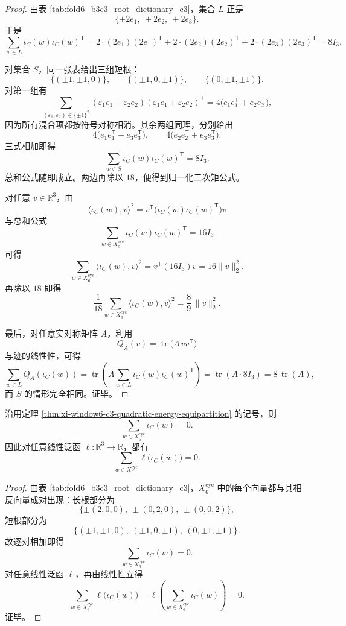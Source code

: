 \begin{proof}
由表 \ref{tab:fold6_b3c3_root_dictionary_c3}，集合 \(L\) 正是
\[
\{\pm 2e_1,\ \pm 2e_2,\ \pm 2e_3\}.
\]
于是
\[
\sum_{w\in L}\iota_C(w)\iota_C(w)^{\mathsf T}
=
2\cdot(2e_1)(2e_1)^{\mathsf T}
+2\cdot(2e_2)(2e_2)^{\mathsf T}
+2\cdot(2e_3)(2e_3)^{\mathsf T}
=
8I_3.
\]

对集合 \(S\)，同一张表给出三组短根：
\[
\{(\pm1,\pm1,0)\},
\qquad
\{(\pm1,0,\pm1)\},
\qquad
\{(0,\pm1,\pm1)\}.
\]
对第一组有
\[
\sum_{(\varepsilon_1,\varepsilon_2)\in\{\pm1\}^2}
(\varepsilon_1 e_1+\varepsilon_2 e_2)
(\varepsilon_1 e_1+\varepsilon_2 e_2)^{\mathsf T}
=
4\bigl(e_1e_1^{\mathsf T}+e_2e_2^{\mathsf T}\bigr),
\]
因为所有混合项都按符号对称相消。其余两组同理，分别给出
\[
4\bigl(e_1e_1^{\mathsf T}+e_3e_3^{\mathsf T}\bigr),
\qquad
4\bigl(e_2e_2^{\mathsf T}+e_3e_3^{\mathsf T}\bigr).
\]
三式相加即得
\[
\sum_{w\in S}\iota_C(w)\iota_C(w)^{\mathsf T}=8I_3.
\]
总和公式随即成立。两边再除以 \(18\)，便得到归一化二次矩公式。

对任意 \(v\in\mathbb R^3\)，由
\[
\langle \iota_C(w),v\rangle^2
=
v^{\mathsf T}\bigl(\iota_C(w)\iota_C(w)^{\mathsf T}\bigr)v
\]
与总和公式
\[
\sum_{w\in X_6^{\mathrm{cyc}}}\iota_C(w)\iota_C(w)^{\mathsf T}=16I_3
\]
可得
\[
\sum_{w\in X_6^{\mathrm{cyc}}}\langle \iota_C(w),v\rangle^2
=
v^{\mathsf T}(16I_3)v
=
16\|v\|_2^2.
\]
再除以 \(18\) 即得
\[
\frac1{18}\sum_{w\in X_6^{\mathrm{cyc}}}\langle \iota_C(w),v\rangle^2
=
\frac89\,\|v\|_2^2.
\]

最后，对任意实对称矩阵 \(A\)，利用
\[
Q_A(v)=\operatorname{tr}\!\bigl(A\,vv^{\mathsf T}\bigr)
\]
与迹的线性性，可得
\[
\sum_{w\in L}Q_A(\iota_C(w))
=
\operatorname{tr}\!\left(
A\sum_{w\in L}\iota_C(w)\iota_C(w)^{\mathsf T}
\right)
=
\operatorname{tr}(A\cdot 8I_3)
=
8\,\operatorname{tr}(A),
\]
而 \(S\) 的情形完全相同。证毕。
\end{proof}

\begin{corollary}\label{cor:xi-window6-c3-no-nonzero-linear-invariant}
沿用定理 \ref{thm:xi-window6-c3-quadratic-energy-equipartition} 的记号，则
\[
\sum_{w\in X_6^{\mathrm{cyc}}}\iota_C(w)=0.
\]
因此对任意线性泛函 \(\ell:\mathbb R^3\to\mathbb R\)，都有
\[
\sum_{w\in X_6^{\mathrm{cyc}}}\ell\bigl(\iota_C(w)\bigr)=0.
\]
\end{corollary}
\begin{proof}
由表 \ref{tab:fold6_b3c3_root_dictionary_c3}，\(X_6^{\mathrm{cyc}}\) 中的每个向量都与其相反向量成对出现：长根部分为
\[
\{\pm(2,0,0),\ \pm(0,2,0),\ \pm(0,0,2)\},
\]
短根部分为
\[
\{(\pm1,\pm1,0),\ (\pm1,0,\pm1),\ (0,\pm1,\pm1)\}.
\]
故逐对相加即得
\[
\sum_{w\in X_6^{\mathrm{cyc}}}\iota_C(w)=0.
\]
对任意线性泛函 \(\ell\)，再由线性性立得
\[
\sum_{w\in X_6^{\mathrm{cyc}}}\ell\bigl(\iota_C(w)\bigr)
=
\ell\!\left(\sum_{w\in X_6^{\mathrm{cyc}}}\iota_C(w)\right)
=
0.
\]
证毕。
\end{proof}

\endinput
